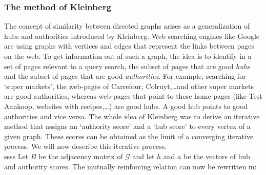 \documentclass[a4paper,11pt]{report}
\newcommand{\graf}{\mathscr{G}}
\begin{document}
\subsubsection{The method of Kleinberg}
The concept of similarity between directed graphs arises as a generalization of 
hubs and authorities introduced by Kleinberg\cite{kleinberg}. Web searching engines like Google are using graphs with 
vertices and edges that represent the links between pages on the web. To get 
information out af such a graph, the idea is to identify in a set of pages 
relevant to a query search, the subset of pages that are good \emph{hubs} and the 
subset of pages that are good \emph{authorities}. For example, searching for 
`super markets', the web-pages of Carrefour, Colruyt,\ldots and other super markets 
are good authorities, whereas web-pages that point to these home-pages (like Test Aankoop, websites with 
recipes,\ldots) are good hubs. A good hub points to good authorities and vice versa. 
The whole idea of Kleinberg was to derive an iterative method that assigns an
`authority score' and a `hub score' to every vertex of a given graph. These 
scores can be obtained as the limit of a converging iterative process. We will 
now describe this iterative process.\\

ssss
Let $B$ be the adjacency matrix of $\graf$ and let $h$ and $a$ be the vectors of 
hub and authority scores. The mutually reinforcing relation can now be rewritten 
in:
\end{document}
